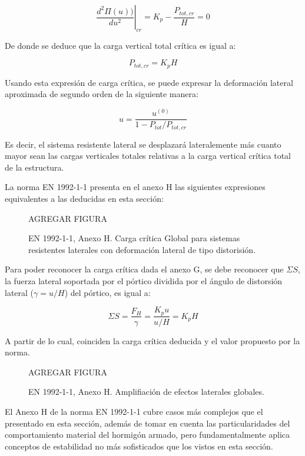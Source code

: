 $$\left.\frac{d^2 \Pi(u))}{d u^2}\right|_{cr} = K_p-\frac{P_{tot,cr}}{H}=0$$

De donde se deduce que la carga vertical total crítica es igual a:

$$P_{tot,cr} = K_p H$$

Usando esta expresión de carga crítica, se puede expresar la deformación lateral aproximada de segundo orden de la siguiente manera:

$$u=\frac{u^{(0)}}{1 - P_{tot}/P_{tot,cr}}$$

Es decir, el sistema resistente lateral se desplazará lateralemente más cuanto mayor sean las cargas verticales totales relativas a la carga vertical crítica total de la estructura.

La norma EN 1992-1-1 presenta en el anexo H las siguientes expresiones equivalentes a las deducidas en esta sección:

\begin{figure}[htb]
	\centering
	AGREGAR FIGURA
	\caption{EN 1992-1-1, Anexo H. Carga crítica Global para sistemas resistentes laterales con deformación lateral de tipo distorisión.}
	\label{fig:EN_Pcrit}
\end{figure}

Para poder reconocer la carga crítica dada el anexo G, se debe reconocer que $\Sigma S$, la fuerza lateral soportada por el pórtico dividida por el ángulo de distorsión lateral ($\gamma = u / H$) del pórtico, es igual a:

$$ \Sigma S = \frac{F_H}{\gamma} = \frac{K_p u}{u/H} = K_p H  $$

A partir de lo cual, coinciden la carga crítica deducida y el valor propuesto por la norma. 

\begin{figure}[htb]
	\centering
	AGREGAR FIGURA
	\caption{EN 1992-1-1, Anexo H. Amplifiación de efectos laterales globales.}
\label{fig:EN_Pcrit}
\end{figure}

El Anexo H de la norma EN 1992-1-1 cubre casos más complejos que el presentado en esta sección, además de tomar en cuenta las particularidades del comportamiento material del hormigón armado, pero fundamentalmente aplica conceptos de estabilidad no más sofisticados que los vistos en esta sección.







